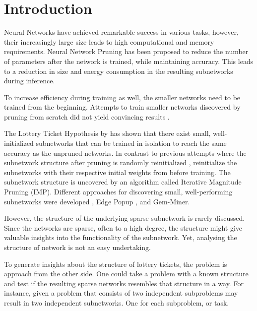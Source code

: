 \chapter{Introduction}
Neural Networks have achieved remarkable success in various tasks, however, their increasingly large size leads to high computational and memory requirements.
Neural Network Pruning \autocite{LeCun, OptimalBrainSurgeon, HanEtAl15, PruningFiltersForEfficientConvets} has been proposed to reduce the number of parameters after the network is trained, while maintaining accuracy.
This leads to a reduction in size \autocite{HanEtAl15} and energy consumption \autocite{YangCS17} in the resulting subnetworks during inference.

To increase efficiency during training as well, the smaller networks need to be trained from the beginning. Attempts to train smaller networks discovered by pruning from scratch did not yield convincing results \autocite{HanEtAl15, PruningFiltersForEfficientConvets}.

The Lottery Ticket Hypothesis by \textcite{LTH} has shown that there exist small, well-initialized subnetworks that can be trained in isolation to reach the same accuracy as the unpruned networks. 
In contrast to previous attempts where the subnetwork structure after pruning is randomly reinitialized \autocite{HanEtAl15, PruningFiltersForEfficientConvets}, \textcite{LTH} reinitialize the subnetworks with their respective initial weights from before training.
The subnetwork structure is uncovered by an algorithm called Iterative Magnitude Pruning (IMP).
Different approaches for discovering small, well-performing subnetworks were developed \autocite{Supermasks}, Edge Popup \autocite{DBLP:conf/cvpr/RamanujanWKFR20}, and Gem-Miner\autocite{RareGems}.

However, the structure of the underlying sparse subnetwork is rarely discussed.
Since the networks are sparse, often to a high degree, the structure might give valuable insights into the functionality of the subnetwork.
Yet, analysing the structure of network is not an easy undertaking.

To generate insights about the structure of lottery tickets, the problem is approach from the other side.
One could take a problem with a known structure and test if the resulting sparse networks resembles that structure in a way.
For instance, given a problem that consists of two independent subproblems may result in two independent subnetworks. 
One for each subproblem, or task.

